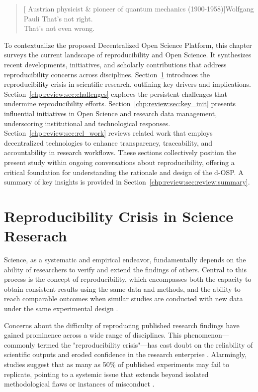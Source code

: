 \documentclass[final]{rc-book-2.14}
\begin{document}
\begin{quotation}[ Austrian physicist \& pioneer of quantum mechanics (1900-1958)]{Wolfgang Pauli}
    That's not right. \\  That's not even wrong.
\end{quotation}

\drop To contextualize the proposed Decentralized Open Science Platform, this chapter surveys the current landscape of reproducibility and Open Science. It synthesizes recent developments, initiatives, and scholarly contributions that address reproducibility concerns across disciplines. Section~\ref{chp:review:sec:rep_crisis} introduces the reproducibility crisis in scientific research, outlining key drivers and implications. Section~\ref{chp:review:sec:challenges} explores the persistent challenges that undermine reproducibility efforts. Section~\ref{chp:review:sec:key_init} presents influential initiatives in Open Science and research data management, underscoring institutional and technological responses. Section~\ref{chp:review:sec:rel_work} reviews related work that employs decentralized technologies to enhance transparency, traceability, and accountability in research workflows. These sections collectively position the present study within ongoing conversations about reproducibility, offering a critical foundation for understanding the rationale and design of the d-OSP. A summary of key insights is provided in Section~\ref{chp:review:sec:review:summary}.



\newpage

\section{Reproducibility Crisis in Science Reserach}
\label{chp:review:sec:rep_crisis}

Science, as a systematic and empirical endeavor, fundamentally depends on the ability of researchers to verify and extend the findings of others. Central to this process is the concept of reproducibility, which encompasses both the capacity to obtain consistent results using the same data and methods, and the ability to reach comparable outcomes when similar studies are conducted with new data under the same experimental design \cite{pellizzari_reproducibility_2017, committee_2019}. 

Concerns about the difficulty of reproducing published research findings have gained prominence across a wide range of disciplines. This phenomenon—commonly termed the "reproducibility crisis"—has cast doubt on the reliability of scientific outputs and eroded confidence in the research enterprise \cite{baker2016reproducibility}. Alarmingly, studies suggest that as many as 50\% of published experiments may fail to replicate, pointing to a systemic issue that extends beyond isolated methodological flaws or instances of misconduct \cite{branch_reproducibility_2019}. 
\end{document}
